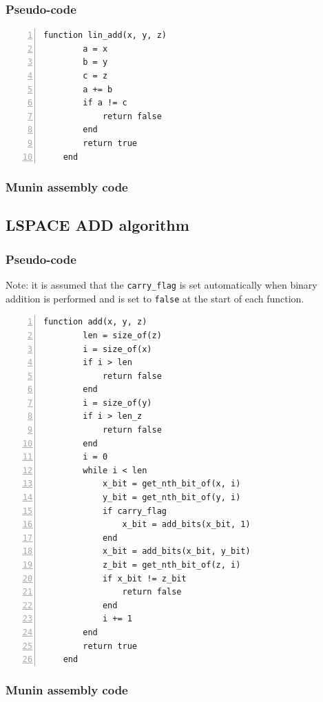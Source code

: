 \documentclass[11pt, a4paper]{article}
\begin{document}
\subsubsection{Pseudo-code}

\begin{lstlisting}[numbers=left]
    function lin_add(x, y, z)
        a = x
        b = y
        c = z
        a += b
        if a != c
            return false
        end
        return true
    end
\end{lstlisting}

\subsubsection{Munin assembly code}



\subsection{LSPACE ADD algorithm}\label{app:lAdd}

\subsubsection{Pseudo-code}

Note: it is assumed that the \lstinline|carry_flag| is set automatically when binary addition is performed and is set to \lstinline|false| at the start of each function.

\begin{lstlisting}[numbers=left]
    function add(x, y, z)
        len = size_of(z)
        i = size_of(x)
        if i > len
            return false
        end
        i = size_of(y)
        if i > len_z
            return false
        end
        i = 0
        while i < len
            x_bit = get_nth_bit_of(x, i)
            y_bit = get_nth_bit_of(y, i)
            if carry_flag
                x_bit = add_bits(x_bit, 1)
            end
            x_bit = add_bits(x_bit, y_bit)
            z_bit = get_nth_bit_of(z, i)
            if x_bit != z_bit
                return false
            end
            i += 1
        end
        return true
    end
\end{lstlisting}

\subsubsection{Munin assembly code}
\end{document}
